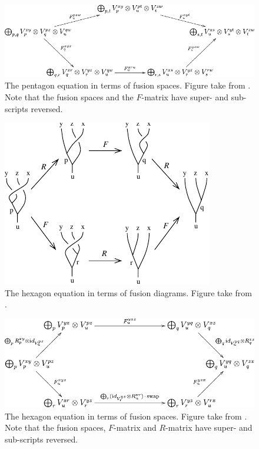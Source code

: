 \documentclass[a4paper,10pt,oneside]{book}
\theoremstyle{plain}
\theoremstyle{definition}
\theoremstyle{remark}
\begin{document}
\begin{figure}[!htb]
  \centering
  \includegraphics[width=1\linewidth]{img/pentagon_space.pdf}
  \caption{The pentagon equation in terms of fusion spaces. Figure take from \cite{kitaev}. Note that the fusion spaces and the $F$-matrix have super- and sub-scripts reversed.}
  \label{fig:pentagon_space}
\end{figure}

\begin{figure}[!htb]
  \centering
  \includegraphics[width=0.8\linewidth]{img/hexagon_diagram.pdf}
  \caption{The hexagon equation in terms of fusion diagrams. Figure take from \cite{kitaev}.}
  \label{fig:hexagon_diagram}
\end{figure}

\begin{figure}[!htb]
  \centering
  \includegraphics[width=1\linewidth]{img/hexagon_space.pdf}
  \caption{The hexagon equation in terms of fusion spaces. Figure take from \cite{kitaev}. Note that the fusion spaces, $F$-matrix and $R$-matrix have super- and sub-scripts reversed.}
  \label{fig:hexagon_space}
\end{figure}
\end{document}
